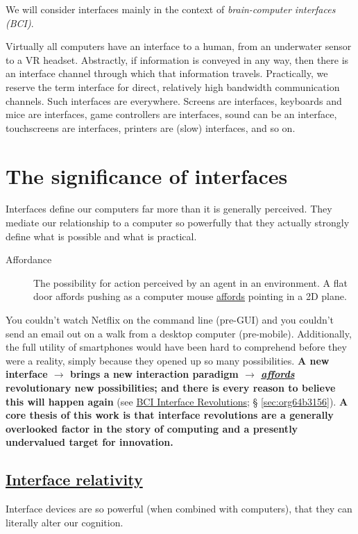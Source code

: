 \documentclass[logo,bsc,singlespacing,parskip]{infthesis}
\begin{document}
We will consider interfaces mainly in the context of \emph{brain-computer interfaces (BCI)}.

Virtually all computers have an interface to a human, from an underwater sensor to a VR headset.
Abstractly, if information is conveyed in any way, then there is an interface channel through which that information travels.
Practically, we reserve the term interface for direct, relatively high bandwidth communication channels.
Such interfaces are everywhere.
Screens are interfaces, keyboards and mice are interfaces, game controllers are interfaces, sound can be an interface, touchscreens are interfaces, printers are (slow) interfaces, and so on.
\section{The significance of interfaces}
\label{sec:orga22829b}
Interfaces define our computers far more than it is generally perceived.
They mediate our relationship to a computer so powerfully that they actually strongly define what is possible and what is practical.

\begin{mdframed}
\begin{description}
\item[{\label{orgc81e530}Affordance}] The possibility for action perceived by an agent in an environment. A flat door \label{orgee1980c}affords pushing as a computer mouse \hyperref[orgee1980c]{affords} pointing in a 2D plane.
\end{description}
\end{mdframed}

You couldn't watch Netflix on the command line (pre-GUI) and you couldn't send an email out on a walk from a desktop computer (pre-mobile).
Additionally, the full utility of smartphones would have been hard to comprehend before they were a reality, simply because they opened up so many possibilities.
\textbf{A new interface \(\rightarrow\) brings a new interaction paradigm \(\rightarrow\) \emph{\hyperref[orgee1980c]{affords}} revolutionary new possibilities; and there is every reason to believe this will happen again} (see \hyperref[sec:org64b3156]{BCI Interface Revolutions}; § \ref{sec:org64b3156}).
\textbf{A core thesis of this work is that interface revolutions are a generally overlooked factor in the story of computing and a presently undervalued target for innovation.}
\subsection{\hyperref[orga1fe683]{Interface relativity}}
\label{sec:org257bb66}
Interface devices are so powerful (when combined with computers), that they can literally alter our cognition.
\end{document}
